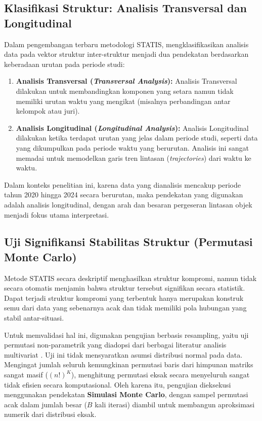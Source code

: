 \subsection{\normalsize Klasifikasi Struktur: Analisis Transversal dan Longitudinal}

Dalam pengembangan terbaru metodologi STATIS, \citet{oliveira2024} mengklasifikasikan analisis data pada vektor struktur inter-struktur menjadi dua pendekatan berdasarkan keberadaan urutan pada periode studi:

\begin{enumerate}
    \item \textbf{Analisis Transversal (\textit{Transversal Analysis}):} Analisis Transversal dilakukan untuk membandingkan komponen yang setara namun tidak memiliki urutan waktu yang mengikat (misalnya perbandingan antar kelompok atau juri).
    \item \textbf{Analisis Longitudinal (\textit{Longitudinal Analysis}):} Analisis Longitudinal dilakukan ketika terdapat urutan yang jelas dalam periode studi, seperti data yang dikumpulkan pada periode waktu yang berurutan. Analisis ini sangat memadai untuk memodelkan garis tren lintasan (\textit{trajectories}) dari waktu ke waktu.
\end{enumerate}

Dalam konteks penelitian ini, karena data yang dianalisis mencakup periode tahun 2020 hingga 2024 secara berurutan, maka pendekatan yang digunakan adalah analisis longitudinal, dengan arah dan besaran pergeseran lintasan objek menjadi fokus utama interpretasi.

\subsection{\normalsize Uji Signifikansi Stabilitas Struktur (Permutasi Monte Carlo)}

Metode STATIS secara deskriptif menghasilkan struktur kompromi, namun tidak secara otomatis menjamin bahwa struktur tersebut signifikan secara statistik. Dapat terjadi struktur kompromi yang terbentuk hanya merupakan konstruk semu dari data yang sebenarnya acak dan tidak memiliki pola hubungan yang stabil antar-situasi.

Untuk memvalidasi hal ini, digunakan pengujian berbasis resampling, yaitu uji permutasi non-parametrik yang diadopsi dari berbagai literatur analisis multivariat \citep{kazi1995, abdi2012, legendre2012}. Uji ini tidak mensyaratkan asumsi distribusi normal pada data. Mengingat jumlah seluruh kemungkinan permutasi baris dari himpunan matriks sangat masif ($(n!)^K$), menghitung permutasi eksak secara menyeluruh sangat tidak efisien secara komputasional. Oleh karena itu, pengujian dieksekusi menggunakan pendekatan \textbf{Simulasi Monte Carlo}, dengan sampel permutasi acak dalam jumlah besar ($B$ kali iterasi) diambil untuk membangun aproksimasi numerik dari distribusi eksak.


